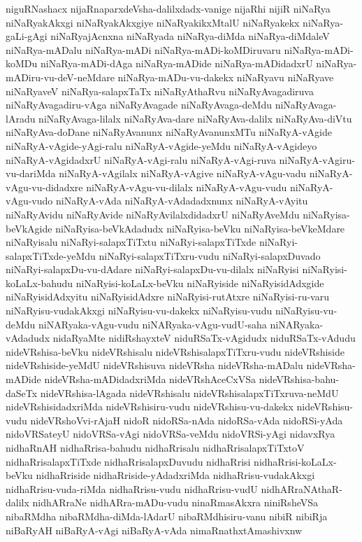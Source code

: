 {niguRNashacx
nijaRnaparxdeVsha-dalilxdadx-vanige
nijaRhi
nijiR
niNaRya
niNaRyakAkxgi
niNaRyakAkxgiye
niNaRyakikxMtalU
niNaRyakekx
niNaRya-gaLi-gAgi
niNaRyajAcnxna
niNaRyada
niNaRya-diMda
niNaRya-diMdaleV
niNaRya-mADalu
niNaRya-mADi
niNaRya-mADi-koMDiruvaru
niNaRya-mADi-koMDu
niNaRya-mADi-dAga
niNaRya-mADide
niNaRya-mADidadxrU
niNaRya-mADiru-vu-deV-neMdare
niNaRya-mADu-vu-dakekx
niNaRyavu
niNaRyave
niNaRyaveV
niNaRya-salapxTaTx
niNaRyAthaRvu
niNaRyAvagadiruva
niNaRyAvagadiru-vAga
niNaRyAvagade
niNaRyAvaga-deMdu
niNaRyAvaga-lAradu
niNaRyAvaga-lilalx
niNaRyAva-dare
niNaRyAva-dalilx
niNaRyAva-diVtu
niNaRyAva-doDane
niNaRyAvanunx
niNaRyAvanunxMTu
niNaRyA-vAgide
niNaRyA-vAgide-yAgi-ralu
niNaRyA-vAgide-yeMdu
niNaRyA-vAgideyo
niNaRyA-vAgidadxrU
niNaRyA-vAgi-ralu
niNaRyA-vAgi-ruva
niNaRyA-vAgiru-vu-dariMda
niNaRyA-vAgilalx
niNaRyA-vAgive
niNaRyA-vAgu-vadu
niNaRyA-vAgu-vu-didadxre
niNaRyA-vAgu-vu-dilalx
niNaRyA-vAgu-vudu
niNaRyA-vAgu-vudo
niNaRyA-vAda
niNaRyA-vAdadadxnunx
niNaRyA-vAyitu
niNaRyAvidu
niNaRyAvide
niNaRyAvilalxdidadxrU
niNaRyAveMdu
niNaRyisa-beVkAgide
niNaRyisa-beVkAdadudx
niNaRyisa-beVku
niNaRyisa-beVkeMdare
niNaRyisalu
niNaRyi-salapxTiTxtu
niNaRyi-salapxTiTxde
niNaRyi-salapxTiTxde-yeMdu
niNaRyi-salapxTiTxru-vudu
niNaRyi-salapxDuvado
niNaRyi-salapxDu-vu-dAdare
niNaRyi-salapxDu-vu-dilalx
niNaRyisi
niNaRyisi-koLaLx-bahudu
niNaRyisi-koLaLx-beVku
niNaRyiside
niNaRyisidAdxgide
niNaRyisidAdxyitu
niNaRyisidAdxre
niNaRyisi-rutAtxre
niNaRyisi-ru-varu
niNaRyisu-vudakAkxgi
niNaRyisu-vu-dakekx
niNaRyisu-vudu
niNaRyisu-vu-deMdu
niNARyaka-vAgu-vudu
niNARyaka-vAgu-vudU-saha
niNARyaka-vAdadudx
nidaRyaMte
nidiRshayxteV
niduRSaTx-vAgidudx
niduRSaTx-vAdudu
nideVRshisa-beVku
nideVRshisalu
nideVRshisalapxTiTxru-vudu
nideVRshiside
nideVRshiside-yeMdU
nideVRshisuva
nideVRsha
nideVRsha-mADalu
nideVRsha-mADide
nideVRsha-mADidadxriMda
nideVRshAceCxVSa
nideVRshisa-bahu-daSeTx
nideVRshisa-lAgada
nideVRshisalu
nideVRshisalapxTiTxruva-neMdU
nideVRshisidadxriMda
nideVRshisiru-vudu
nideVRshisu-vu-dakekx
nideVRshisu-vudu
nideVRshoVvi-rAjaH
nidoR
nidoRSa-nAda
nidoRSa-vAda
nidoRSi-yAda
nidoVRSateyU
nidoVRSa-vAgi
nidoVRSa-veMdu
nidoVRSi-yAgi
nidavxRya
nidhaRnAH
nidhaRrisa-bahudu
nidhaRrisalu
nidhaRrisalapxTiTxtoV
nidhaRrisalapxTiTxde
nidhaRrisalapxDuvudu
nidhaRrisi
nidhaRrisi-koLaLx-beVku
nidhaRriside
nidhaRriside-yAdadxriMda
nidhaRrisu-vudakAkxgi
nidhaRrisu-vuda-riMda
nidhaRrisu-vudu
nidhaRrisu-vudU
nidhARraNAthaR-dalilx
nidhARraNe
nidhARra-mADu-vudu
ninaRmasAkxra
niniRsheVSa
nibaRMdha
nibaRMdha-diMda-lAdarU
nibaRMdhisiru-vanu
nibiR
nibiRja
niBaRyAH
niBaRyA-vAgi
niBaRyA-vAda
nimaRnathxtAmashivxnw
}
